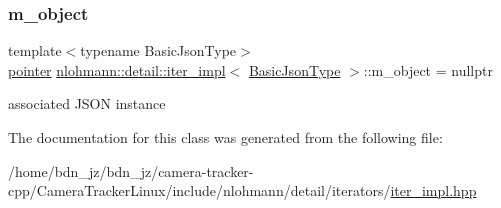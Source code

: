 \subsubsection{\texorpdfstring{m\+\_\+object}{m\_object}}
{\footnotesize\ttfamily template$<$typename Basic\+Json\+Type$>$ \\
\hyperlink{classnlohmann_1_1detail_1_1iter__impl_a69e52f890ce8c556fd68ce109e24b360}{pointer} \hyperlink{classnlohmann_1_1detail_1_1iter__impl}{nlohmann\+::detail\+::iter\+\_\+impl}$<$ \hyperlink{classnlohmann_1_1detail_1_1iter__impl_abf18f18793f84b0222aebb5a2a87da7a}{Basic\+Json\+Type} $>$\+::m\+\_\+object = nullptr\hspace{0.3cm}{\ttfamily [private]}}



associated J\+S\+ON instance 



The documentation for this class was generated from the following file\+:\begin{DoxyCompactItemize}
\item 
/home/bdn\+\_\+jz/bdn\+\_\+jz/camera-\/tracker-\/cpp/\+Camera\+Tracker\+Linux/include/nlohmann/detail/iterators/\hyperlink{iter__impl_8hpp}{iter\+\_\+impl.\+hpp}\end{DoxyCompactItemize}
